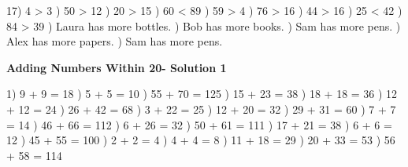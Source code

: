 \documentclass{article}%
\begin{document}
17) 4 > 3%
) 50 > 12%
) 20 > 15%
) 60 < 89%
) 59 > 4%
) 76 > 16%
) 44 > 16%
) 25 < 42%
) 84 > 39%
) Laura has more bottles.%
) Bob has more books.%
) Sam has more pens.%
) Alex has more papers.%
) Sam has more pens.%
\newline%
\newpage%
\large%
\begin{center}%
\textbf{Adding Numbers Within 20- Solution 1}%
\newline%
\end{center} \normalsize%
1) 9 + 9 = 18%
) 5 + 5 = 10%
) 55 + 70 = 125%
) 15 + 23 = 38%
) 18 + 18 = 36%
) 12 + 12 = 24%
) 26 + 42 = 68%
) 3 + 22 = 25%
) 12 + 20 = 32%
) 29 + 31 = 60%
) 7 + 7 = 14%
) 46 + 66 = 112%
) 6 + 26 = 32%
) 50 + 61 = 111%
) 17 + 21 = 38%
) 6 + 6 = 12%
) 45 + 55 = 100%
) 2 + 2 = 4%
) 4 + 4 = 8%
) 11 + 18 = 29%
) 20 + 33 = 53%
) 56 + 58 = 114%
\end{document}
